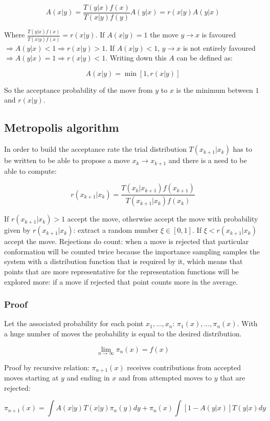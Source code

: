 	$$A(x|y) = \frac{T(y|x)f(x)}{T(x|y)f(y)}A(y|x) = r(x|y)A(y|x)$$

	Where $\frac{T(y|x)f(x)}{T(x|y)f(x)} = r(x|y)$.
	If $A(x|y) = 1$ the move $y\rightarrow x$ is favoured $\Rightarrow A(y|x)< 1 \Rightarrow r(x|y)>1$.
	If $A(x|y) < 1$, $y\rightarrow x$ is not entirely favoured $\Rightarrow A(y|x) = 1\Rightarrow r(x|y) < 1$.
	Writing down this $A$ can be defined as:

	$$A(x|y) = \min[1, r(x|y)]$$

	So the acceptance probability of the move from $y$ to $x$ is the minimum between $1$ and $r(x|y)$.

	\subsection{Metropolis algorithm}
	In order to build the acceptance rate the trial distribution $T(x_{k+1}|x_k)$ has to be written to be able to propose a move $x_k\rightarrow x_{k+1}$ and there is a need to be able to compute:

	$$r(x_{k+1}|x_k) = \frac{T(x_k|x_{k+1})f(x_{k+1})}{T(x_{k+1}|x_k)f(x_k)}$$

	If $r(x_{k+1}|x_k)>1$ accept the move, otherwise accept the move with probability given by $r(x_{k+1}|x_k)$: extract a random number $\xi\in[0,1]$.
	If $\xi< r(x_{k+1}|x_k)$ accept the move.
	Rejections do count: when a move is rejected that particular conformation will be counted twice because the importance sampling samples the system with a distribution function that is required by it, which means that points that are more representative for the representation functions will be explored more: if a move if rejected that point counts more in the average.

		\subsubsection{Proof}
		Let the associated probability for each point $x_1, \dots, x_n$: $\pi_1(x), \dots, \pi_n(x)$.
		With a huge number of moves the probability is equal to the desired distribution.

		$$\lim\limits_{n\rightarrow\infty}\pi_n(x) = f(x)$$

		Proof by recursive relation: $\pi_{n+1}(x)$ receives contributions from accepted moves starting at $y$ and ending in $x$ and from attempted moves to $y$ that are rejected:

		$$\pi_{n+1}(x) = \int A(x|y)T(x|y)\pi_n(y)dy + \pi_n(x)\int[1-A(y|x)]T(y|x)dy$$

